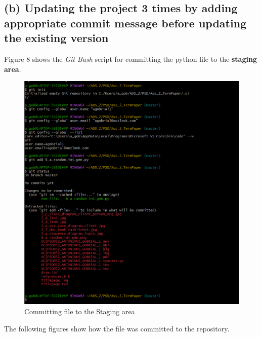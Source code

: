 \documentclass{article}
\begin{document}
\subsection{(b) Updating the project 3 times by adding appropriate commit message before updating the existing version}
Figure 8 shows the \textit{Git Bash} script for committing the python file to the \textbf{staging area}.
\begin{figure}[ht]
	\centering
	\includegraphics[width=\textwidth]{git_1.png}
	\caption{Committing file to the Staging area}
	\label{fig:git_1}
\end{figure}
\newpage
The following figures show how the file was committed to the repository.
\end{document}
